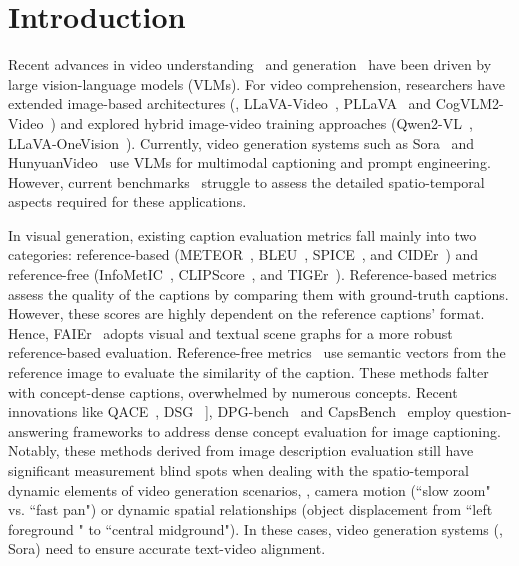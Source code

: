 \section{Introduction}
\label{sec:intro}
Recent advances in video understanding~\cite{reid2024gemini, liu2025st, hong2024cogvlm2, liu2024oryx, zhang2024STGT, li2024aria} and generation~\cite{SORA, vidu, kelin, hunyuanvideo} have been driven by large vision-language models (VLMs). For video comprehension, researchers have extended image-based architectures (\eg, LLaVA-Video~\cite{zhang2024video}, PLLaVA~\cite{xu2024pllava} and CogVLM2-Video~\cite{hong2024cogvlm2}) and explored hybrid image-video training approaches (Qwen2-VL~\cite{wang2024qwen2}, LLaVA-OneVision~\cite{li2024llava}). Currently, video generation systems such as Sora~\cite{SORA} and HunyuanVideo~\cite{hunyuanvideo} use VLMs for multimodal captioning and prompt engineering. However, current benchmarks~\cite{li2024mvbench, li2024videovista, wang2024lvbench, fu2024video, zhou2024mlvu, wu2024longvideobench} struggle to assess the detailed spatio-temporal aspects required for these applications.


In visual generation, existing caption evaluation metrics fall mainly into two categories: reference-based (METEOR~\cite{meteor}, BLEU~\cite{bleu}, SPICE~\cite{Spice}, and CIDEr~\cite{cider}) and reference-free (InfoMetIC~\cite{infometic}, CLIPScore~\cite{Clipscore}, and TIGEr~\cite{Tiger}). Reference-based metrics~\cite{meteor,bleu,Spice,cider} assess the quality of the captions by comparing them with ground-truth captions. However, these scores are highly dependent on the reference captions' format. Hence, FAIEr~\cite{Faier} adopts visual and textual scene graphs for a more robust reference-based evaluation. Reference-free metrics~\cite{infometic,Clipscore,Tiger} use semantic vectors from the reference image to evaluate the similarity of the caption. These methods falter with concept-dense captions, overwhelmed by numerous concepts. Recent innovations like QACE~\cite{QACE}, DSG ~\cite{cho2023davidsonian}], DPG-bench~\cite{Ella} and CapsBench~\cite{playgroundv3} employ question-answering frameworks to address dense concept evaluation for image captioning. Notably, these methods derived from image description evaluation still have significant measurement blind spots when dealing with the spatio-temporal dynamic elements of video generation scenarios, \eg,  camera motion (``slow zoom" vs. ``fast pan") or dynamic spatial relationships (object displacement from ``left foreground " to ``central midground"). 
In these cases, video generation systems (\eg, Sora) need to ensure accurate text-video alignment.

